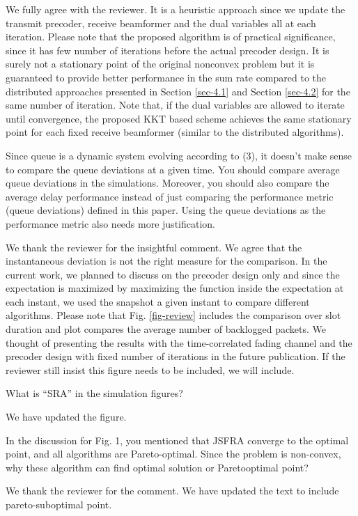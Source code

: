 \resp We fully agree with the reviewer. It is a heuristic approach since we update the transmit precoder, receive beamformer and the dual variables all at each iteration. Please note that the proposed algorithm is of practical significance, since it has few number of iterations before the actual precoder design. It is surely not a stationary point of the original nonconvex problem but it is guaranteed to provide better performance in the sum rate compared to the distributed approaches presented in Section \ref{sec-4.1} and Section \ref{sec-4.2} for the same number of iteration. Note that, if the dual variables are allowed to iterate until convergence, the proposed KKT based scheme achieves the same stationary point for each fixed receive beamformer (similar to the distributed algorithms).

 Since queue is a dynamic system evolving according to (3), it doesn’t make sense to compare the queue deviations at a given time. You should compare average queue deviations in the simulations. Moreover, you should also compare the average delay performance instead of just comparing the performance metric (queue deviations) defined in this paper. Using the queue deviations as the performance metric also needs more justification.

\resp We thank the reviewer for the insightful comment. We agree that the instantaneous deviation is not the right measure for the comparison. In the current work, we planned to discuss on the precoder design only and since the expectation is maximized by maximizing the function inside the expectation at each instant, we used the snapshot a given instant to compare different algorithms. Please note that Fig. \ref{fig-review} includes the comparison over  slot duration and plot compares the average number of backlogged packets. We thought of presenting the results with the time-correlated fading channel and the precoder design with fixed number of iterations in the future publication. If the reviewer still insist this figure needs to be included, we will include.

 What is “SRA” in the simulation figures?

\resp We have updated the figure.

 In the discussion for Fig. 1, you mentioned that JSFRA converge to the optimal point, and all algorithms are Pareto-optimal. Since the problem is non-convex, why these algorithm can find optimal solution or Paretooptimal point? 

\resp We thank the reviewer for the comment. We have updated the text to include pareto-suboptimal point.




